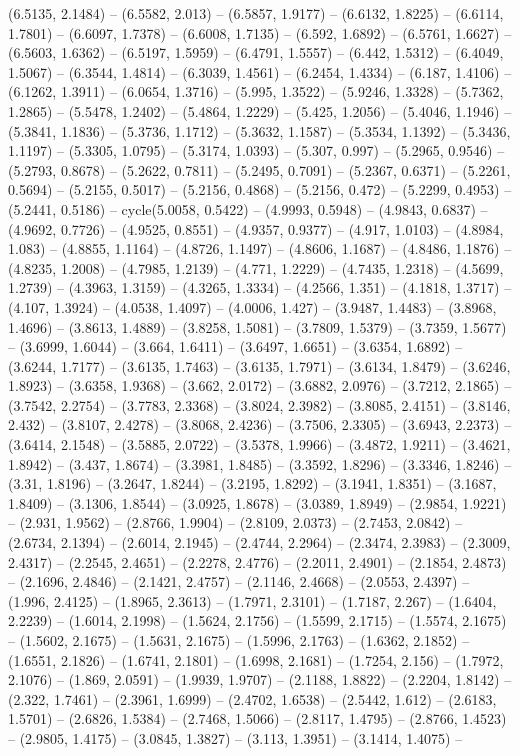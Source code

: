 (6.5135, 2.1484) -- (6.5582, 2.013) -- (6.5857, 1.9177) -- (6.6132, 1.8225) -- (6.6114, 1.7801) -- (6.6097, 1.7378) -- (6.6008, 1.7135) -- (6.592, 1.6892) -- (6.5761, 1.6627) -- (6.5603, 1.6362) -- (6.5197, 1.5959) -- (6.4791, 1.5557) -- (6.442, 1.5312) -- (6.4049, 1.5067) -- (6.3544, 1.4814) -- (6.3039, 1.4561) -- (6.2454, 1.4334) -- (6.187, 1.4106) -- (6.1262, 1.3911) -- (6.0654, 1.3716) -- (5.995, 1.3522) -- (5.9246, 1.3328) -- (5.7362, 1.2865) -- (5.5478, 1.2402) -- (5.4864, 1.2229) -- (5.425, 1.2056) -- (5.4046, 1.1946) -- (5.3841, 1.1836) -- (5.3736, 1.1712) -- (5.3632, 1.1587) -- (5.3534, 1.1392) -- (5.3436, 1.1197) -- (5.3305, 1.0795) -- (5.3174, 1.0393) -- (5.307, 0.997) -- (5.2965, 0.9546) -- (5.2793, 0.8678) -- (5.2622, 0.7811) -- (5.2495, 0.7091) -- (5.2367, 0.6371) -- (5.2261, 0.5694) -- (5.2155, 0.5017) -- (5.2156, 0.4868) -- (5.2156, 0.472) -- (5.2299, 0.4953) -- (5.2441, 0.5186) -- cycle(5.0058, 0.5422) -- (4.9993, 0.5948) -- (4.9843, 0.6837) -- (4.9692, 0.7726) -- (4.9525, 0.8551) -- (4.9357, 0.9377) -- (4.917, 1.0103) -- (4.8984, 1.083) -- (4.8855, 1.1164) -- (4.8726, 1.1497) -- (4.8606, 1.1687) -- (4.8486, 1.1876) -- (4.8235, 1.2008) -- (4.7985, 1.2139) -- (4.771, 1.2229) -- (4.7435, 1.2318) -- (4.5699, 1.2739) -- (4.3963, 1.3159) -- (4.3265, 1.3334) -- (4.2566, 1.351) -- (4.1818, 1.3717) -- (4.107, 1.3924) -- (4.0538, 1.4097) -- (4.0006, 1.427) -- (3.9487, 1.4483) -- (3.8968, 1.4696) -- (3.8613, 1.4889) -- (3.8258, 1.5081) -- (3.7809, 1.5379) -- (3.7359, 1.5677) -- (3.6999, 1.6044) -- (3.664, 1.6411) -- (3.6497, 1.6651) -- (3.6354, 1.6892) -- (3.6244, 1.7177) -- (3.6135, 1.7463) -- (3.6135, 1.7971) -- (3.6134, 1.8479) -- (3.6246, 1.8923) -- (3.6358, 1.9368) -- (3.662, 2.0172) -- (3.6882, 2.0976) -- (3.7212, 2.1865) -- (3.7542, 2.2754) -- (3.7783, 2.3368) -- (3.8024, 2.3982) -- (3.8085, 2.4151) -- (3.8146, 2.432) -- (3.8107, 2.4278) -- (3.8068, 2.4236) -- (3.7506, 2.3305) -- (3.6943, 2.2373) -- (3.6414, 2.1548) -- (3.5885, 2.0722) -- (3.5378, 1.9966) -- (3.4872, 1.9211) -- (3.4621, 1.8942) -- (3.437, 1.8674) -- (3.3981, 1.8485) -- (3.3592, 1.8296) -- (3.3346, 1.8246) -- (3.31, 1.8196) -- (3.2647, 1.8244) -- (3.2195, 1.8292) -- (3.1941, 1.8351) -- (3.1687, 1.8409) -- (3.1306, 1.8544) -- (3.0925, 1.8678) -- (3.0389, 1.8949) -- (2.9854, 1.9221) -- (2.931, 1.9562) -- (2.8766, 1.9904) -- (2.8109, 2.0373) -- (2.7453, 2.0842) -- (2.6734, 2.1394) -- (2.6014, 2.1945) -- (2.4744, 2.2964) -- (2.3474, 2.3983) -- (2.3009, 2.4317) -- (2.2545, 2.4651) -- (2.2278, 2.4776) -- (2.2011, 2.4901) -- (2.1854, 2.4873) -- (2.1696, 2.4846) -- (2.1421, 2.4757) -- (2.1146, 2.4668) -- (2.0553, 2.4397) -- (1.996, 2.4125) -- (1.8965, 2.3613) -- (1.7971, 2.3101) -- (1.7187, 2.267) -- (1.6404, 2.2239) -- (1.6014, 2.1998) -- (1.5624, 2.1756) -- (1.5599, 2.1715) -- (1.5574, 2.1675) -- (1.5602, 2.1675) -- (1.5631, 2.1675) -- (1.5996, 2.1763) -- (1.6362, 2.1852) -- (1.6551, 2.1826) -- (1.6741, 2.1801) -- (1.6998, 2.1681) -- (1.7254, 2.156) -- (1.7972, 2.1076) -- (1.869, 2.0591) -- (1.9939, 1.9707) -- (2.1188, 1.8822) -- (2.2204, 1.8142) -- (2.322, 1.7461) -- (2.3961, 1.6999) -- (2.4702, 1.6538) -- (2.5442, 1.612) -- (2.6183, 1.5701) -- (2.6826, 1.5384) -- (2.7468, 1.5066) -- (2.8117, 1.4795) -- (2.8766, 1.4523) -- (2.9805, 1.4175) -- (3.0845, 1.3827) -- (3.113, 1.3951) -- (3.1414, 1.4075) -- 